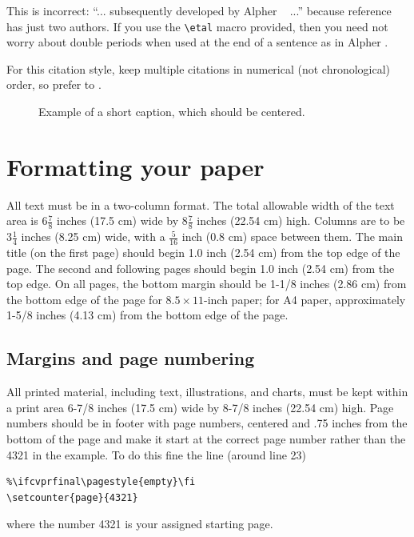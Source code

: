 \documentclass[10pt,twocolumn,letterpaper]{article}
\begin{document}
This is incorrect: ``... subsequently developed by Alpher \etal~\cite{Alpher03} ...''
because reference~\cite{Alpher03} has just two authors.  If you use the
\verb'\etal' macro provided, then you need not worry about double periods
when used at the end of a sentence as in Alpher \etal.

For this citation style, keep multiple citations in numerical (not
chronological) order, so prefer \cite{Alpher03,Alpher02,Authors14} to
\cite{Alpher02,Alpher03,Authors14}.


\begin{figure}
\begin{center}
\fbox{\rule{0pt}{2in} \rule{.9\linewidth}{0pt}}
\end{center}
   \caption{Example of a short caption, which should be centered.}
\label{fig:short}
\end{figure}

\section{Formatting your paper}

All text must be in a two-column format. The total allowable width of the
text area is $6\frac78$ inches (17.5 cm) wide by $8\frac78$ inches (22.54
cm) high. Columns are to be $3\frac14$ inches (8.25 cm) wide, with a
$\frac{5}{16}$ inch (0.8 cm) space between them. The main title (on the
first page) should begin 1.0 inch (2.54 cm) from the top edge of the
page. The second and following pages should begin 1.0 inch (2.54 cm) from
the top edge. On all pages, the bottom margin should be 1-1/8 inches (2.86
cm) from the bottom edge of the page for $8.5 \times 11$-inch paper; for A4
paper, approximately 1-5/8 inches (4.13 cm) from the bottom edge of the
page.

\subsection{Margins and page numbering}

All printed material, including text, illustrations, and charts, must be kept
within a print area 6-7/8 inches (17.5 cm) wide by 8-7/8 inches (22.54 cm)
high.
Page numbers should be in footer with page numbers, centered and .75
inches from the bottom of the page and make it start at the correct page
number rather than the 4321 in the example.  To do this fine the line (around
line 23)
\begin{verbatim}
%\ifcvprfinal\pagestyle{empty}\fi
\setcounter{page}{4321}
\end{verbatim}
where the number 4321 is your assigned starting page.
\end{document}
